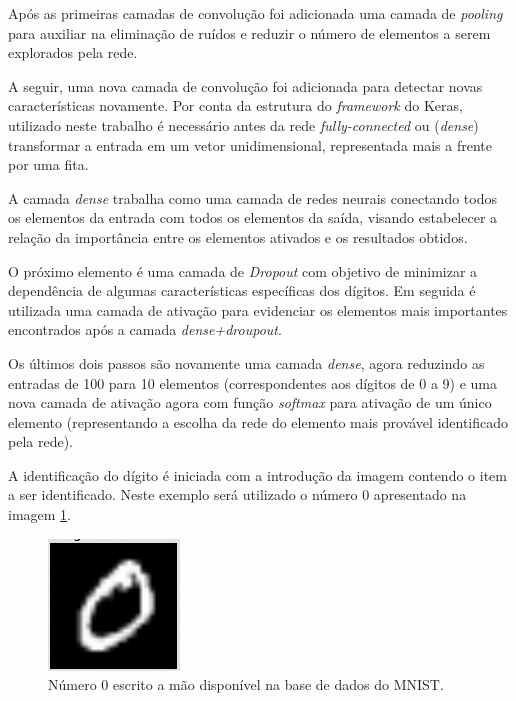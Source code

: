 \documentclass[
	12pt,				%
	oneside,			%
	a4paper,			%
	english,			%
	french,				%
	spanish,			%
	brazil,				%
	]{abntex2}
\begin{document}
\par Após as primeiras camadas de convolução foi adicionada uma camada de \textit{pooling} para auxiliar na eliminação de ruídos e reduzir o número de elementos a serem explorados pela rede.
\par A seguir, uma nova camada de convolução foi adicionada para detectar novas características novamente. Por conta da estrutura do \textit{framework} do Keras, utilizado neste trabalho é necessário antes da rede \textit{fully-connected} ou (\textit{dense}) transformar a entrada em um vetor unidimensional, representada mais a frente por uma fita.
\par A camada \textit{dense} trabalha como uma camada de redes neurais conectando todos os elementos da entrada com todos os elementos da saída, visando estabelecer a relação da importância entre os elementos ativados e os resultados obtidos.
\par O próximo elemento é uma camada de \textit{Dropout} com objetivo de minimizar a dependência de algumas características específicas dos dígitos. Em seguida é utilizada uma camada de ativação para evidenciar os elementos mais importantes encontrados após a camada \textit{dense+droupout}.
\par Os últimos dois passos são novamente uma camada \textit{dense}, agora reduzindo as entradas de 100 para 10 elementos  (correspondentes aos dígitos de 0 a 9) e uma nova camada de ativação agora com função \textit{softmax} para ativação de um único elemento (representando a escolha da rede do elemento mais provável identificado pela rede).

\par A identificação do dígito é iniciada com a introdução da imagem contendo o item a ser identificado. Neste exemplo será utilizado o número 0 apresentado na imagem \ref{fig:numero_0}.

\begin{figure}
	\centering
	\includegraphics[width=0.3\linewidth]{images/fabio/numero_0}
	\caption{Número 0 escrito a mão disponível na base de dados do MNIST.}
	\label{fig:numero_0}
\end{figure}
\end{document}
